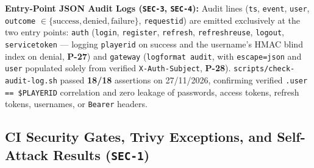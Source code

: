 \documentclass[10.5pt,a4paper]{article}
\DeclareRobustCommand{\code}[1]{\begingroup\def\_{\textunderscore\allowbreak}\texttt{#1}\endgroup}
\begin{document}
\textbf{Entry-Point JSON Audit Logs (\code{SEC-3}, \code{SEC-4}):} Audit lines (\code{ts}, \code{event}, \code{user}, \code{outcome} $\in \{\text{success}, \text{denied}, \text{failure}\}$, \code{request\_id}) are emitted exclusively at the two entry points: \code{auth} (\code{login}, \code{register}, \code{refresh}, \code{refresh\_reuse}, \code{logout}, \code{service\_token} — logging \code{player\_id} on success and the username's HMAC blind index on denial, \textbf{P-27}) and \code{gateway} (\code{log\_format audit}, with \code{escape=json} and \code{user} populated solely from verified \code{X-Auth-Subject}, \textbf{P-28}). \code{scripts/\allowbreak check-audit-log.sh} passed \textbf{18/18} assertions on 27/11/2026, confirming verified \code{.user == \$PLAYER\_ID} correlation and zero leakage of passwords, access tokens, refresh tokens, usernames, or \code{Bearer} headers.

\subsection{CI Security Gates, Trivy Exceptions, and Self-Attack Results (\code{SEC-1})}
\end{document}
